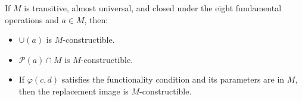 If $M$ is transitive, almost universal, and closed under the eight fundamental operations and $a \in M$, then:
\begin{itemize}
\item[(1)] $\cup(a)$ is $M$-constructible.
\item[(2)] $\mathcal{P}(a) \cap M$ is $M$-constructible.
\item[(3)] If $\varphi(c, d)$ satisfies the functionality condition and its parameters are in $M$, then the replacement image is $M$-constructible.
\end{itemize}
